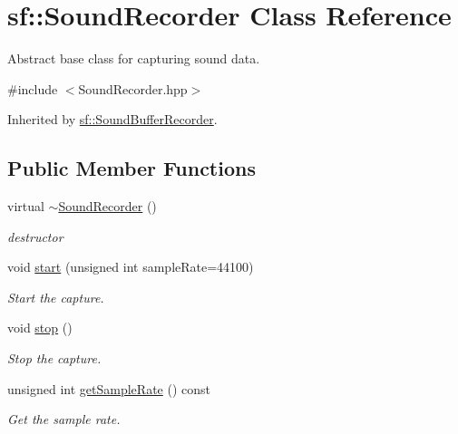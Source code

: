 \hypertarget{classsf_1_1_sound_recorder}{\section{sf\+:\+:Sound\+Recorder Class Reference}
\label{classsf_1_1_sound_recorder}
}


Abstract base class for capturing sound data.  




{\ttfamily \#include $<$Sound\+Recorder.\+hpp$>$}



Inherited by \hyperlink{classsf_1_1_sound_buffer_recorder}{sf\+::\+Sound\+Buffer\+Recorder}.

\subsection*{Public Member Functions}
\begin{DoxyCompactItemize}
\item 
\hypertarget{classsf_1_1_sound_recorder_acc599e61aaa47edaae88cf43f0a43549}{virtual \hyperlink{classsf_1_1_sound_recorder_acc599e61aaa47edaae88cf43f0a43549}{$\sim$\+Sound\+Recorder} ()}\label{classsf_1_1_sound_recorder_acc599e61aaa47edaae88cf43f0a43549}

\begin{DoxyCompactList}\small\item\em destructor \end{DoxyCompactList}\item 
void \hyperlink{classsf_1_1_sound_recorder_a777e633114f7221cd7554a6ed486259e}{start} (unsigned int sample\+Rate=44100)
\begin{DoxyCompactList}\small\item\em Start the capture. \end{DoxyCompactList}\item 
void \hyperlink{classsf_1_1_sound_recorder_a8d9c8346aa9aa409cfed4a1101159c4c}{stop} ()
\begin{DoxyCompactList}\small\item\em Stop the capture. \end{DoxyCompactList}\item 
unsigned int \hyperlink{classsf_1_1_sound_recorder_a1f3726cbe0a2b2b291b36beea57960d7}{get\+Sample\+Rate} () const 
\begin{DoxyCompactList}\small\item\em Get the sample rate. \end{DoxyCompactList}\end{DoxyCompactItemize}
